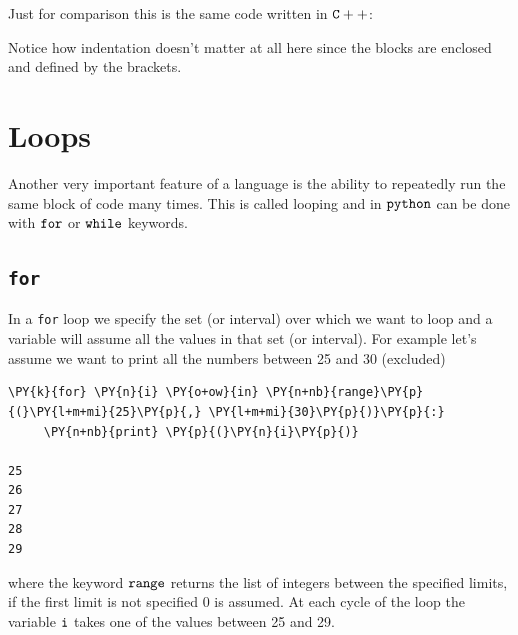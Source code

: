 Just for comparison this is the same code written in $\tt{C++}$:

\begin{Shaded}
\begin{Highlighting}[]
\NormalTok{) \{}
\NormalTok{);}
\NormalTok{\}}
 \NormalTok{) \{}
\NormalTok{);}
\NormalTok{\}}
\NormalTok{ \{}
\NormalTok{);}
\NormalTok{\}}
\end{Highlighting}
\end{Shaded}
Notice how indentation doesn't matter at all here since the blocks are enclosed and 
defined by the brackets.

\section{Loops}\label{loops}

Another very important feature of a language is the ability to repeatedly run the same 
block of code many times. This is called looping and in \(\tt{python}\) can be done
 with $\tt{for}$ or $\tt{while}$ keywords.

\subsection{\texttt{for}}\label{for}

In a \texttt{for} loop we specify the set (or interval) over which we want to loop and a 
variable will assume all the values in that set (or interval). For example let's assume we 
want to print all the numbers between 25 and 30 (excluded) 

\begin{codebox}            
\begin{Verbatim}[commandchars=\\\{\}]
\PY{k}{for} \PY{n}{i} \PY{o+ow}{in} \PY{n+nb}{range}\PY{p}{(}\PY{l+m+mi}{25}\PY{p}{,} \PY{l+m+mi}{30}\PY{p}{)}\PY{p}{:}
     \PY{n+nb}{print} \PY{p}{(}\PY{n}{i}\PY{p}{)}

25
26
27
28
29
\end{Verbatim}
\end{codebox}
\noindent
where the keyword $\tt{range}$ returns the list of integers between the specified limits, 
if the first limit is not specified 0 is assumed.
At each cycle of the loop the variable $\tt{i}$ takes one of the values between
25 and 29. 

